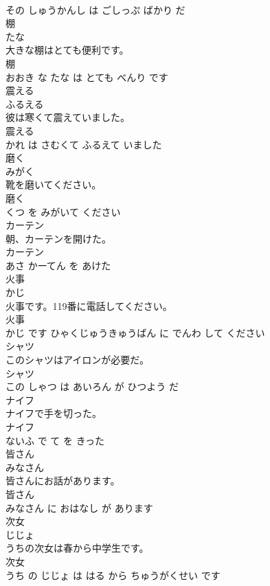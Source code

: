 \documentclass[8pt]{extreport}
\begin{document}
\begin{CJK}{UTF8}{min}
\\	その しゅうかんし は ごしっぷ ばかり だ			
\\	棚	
\\	たな			
\\	大きな棚はとても便利です。	
\\	棚 
\\	おおき な たな は とても べんり です			
\\	震える	
\\	ふるえる			
\\	彼は寒くて震えていました。	
\\	震える 
\\	かれ は さむくて ふるえて いました			
\\	磨く	
\\	みがく			
\\	靴を磨いてください。	
\\	磨く 
\\	くつ を みがいて ください			
\\	カーテン	
\\	朝、カーテンを開けた。	
\\	カーテン 
\\	あさ かーてん を あけた			
\\	火事	
\\	かじ			
\\	火事です。119番に電話してください。	
\\	火事 
\\	かじ です ひゃくじゅうきゅうばん に でんわ して ください			
\\	シャツ	
\\	このシャツはアイロンが必要だ。	
\\	シャツ 
\\	この しゃつ は あいろん が ひつよう だ			
\\	ナイフ	
\\	ナイフで手を切った。	
\\	ナイフ 
\\	ないふ で て を きった			
\\	皆さん	
\\	みなさん			
\\	皆さんにお話があります。	
\\	皆さん 
\\	みなさん に おはなし が あります			
\\	次女	
\\	じじょ			
\\	うちの次女は春から中学生です。	
\\	次女 
\\	うち の じじょ は はる から ちゅうがくせい です			

\end{CJK}
\end{document}
